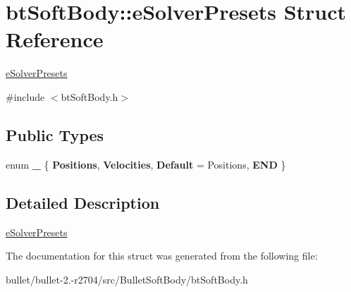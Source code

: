 \hypertarget{structbt_soft_body_1_1e_solver_presets}{\section{bt\+Soft\+Body\+:\+:e\+Solver\+Presets Struct Reference}
\label{structbt_soft_body_1_1e_solver_presets}
}


\hyperlink{structbt_soft_body_1_1e_solver_presets}{e\+Solver\+Presets}  




{\ttfamily \#include $<$bt\+Soft\+Body.\+h$>$}

\subsection*{Public Types}
\begin{DoxyCompactItemize}
\item 
\hypertarget{structbt_soft_body_1_1e_solver_presets_aca9f468831b5ac0c35998d8202caf049}{enum {\bfseries \+\_\+} \{ {\bfseries Positions}, 
{\bfseries Velocities}, 
{\bfseries Default} = Positions, 
{\bfseries E\+N\+D}
 \}}\label{structbt_soft_body_1_1e_solver_presets_aca9f468831b5ac0c35998d8202caf049}

\end{DoxyCompactItemize}


\subsection{Detailed Description}
\hyperlink{structbt_soft_body_1_1e_solver_presets}{e\+Solver\+Presets} 

The documentation for this struct was generated from the following file\+:\begin{DoxyCompactItemize}
\item 
bullet/bullet-\/2.-\/r2704/src/\+Bullet\+Soft\+Body/bt\+Soft\+Body.\+h\end{DoxyCompactItemize}
